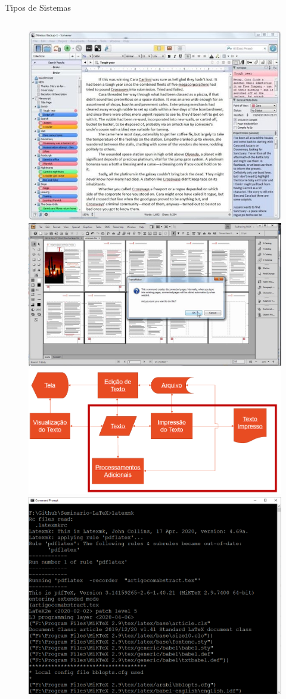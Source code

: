\documentclass{beamer}
\begin{document}
\begin{frame}[shrink=10]{Tipos de Sistemas}
\begin{columns}
\begin{column}{0.5\textwidth}
\begin{figure}
\begin{overprint}
                        \includegraphics[width=0.8\linewidth]{Images/scrivener.jpg}    
                        \includegraphics[width=0.8\linewidth]{Images/framemaker.png}    
                        \includegraphics[width=0.8\linewidth]{Images/latex1.png}    
                        \includegraphics[width=0.8\linewidth]{Images/latex2.png}     

\end{overprint}
\end{figure}
\end{column}
\end{columns}
\end{frame}
\end{document}
